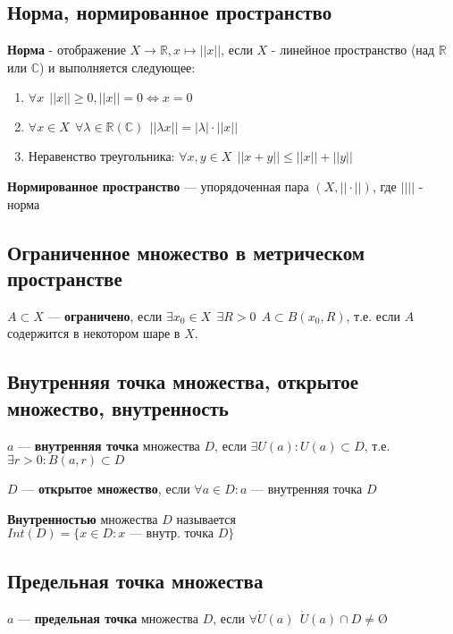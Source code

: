 \subsection{Норма, нормированное пространство}

\textbf{Норма} - отображение $X\to\mathbb{R}, x\mapsto ||x||$, если $X$ - линейное пространство (над $\mathbb{R}$ или $\mathbb{C}$) и выполняется следующее:
\begin{enumerate}
\item $\forall x \ \ ||x||\geq 0, ||x||=0\Leftrightarrow x=0$
\item $\forall x\in X \ \ \forall \lambda\in\mathbb R(\mathbb{C}) \ \ ||\lambda x||=|\lambda|\cdot||x||$
\item Неравенство треугольника: $\forall x,y\in X \ \ ||x+y||\leq||x||+||y||$
\end{enumerate}

\textbf{Нормированное пространство} --- упорядоченная пара $(X, ||\cdot||)$, где $|| ||$ - норма

\subsection{Ограниченное множество в метрическом пространстве}

$A\subset X$ --- {\bf ограничено}, если $\exists x_0\in X \ \ \exists R>0 \ \ A\subset B(x_0, R)$, т.е. если $A$ содержится в некотором шаре в $X$.

\subsection{Внутренняя точка множества, открытое множество, внутренность}

$a$ --- {\bf внутренняя точка} множества $D$, если $\exists U(a) : U(a)\subset D$, т.е. $\exists r>0 : B(a,r)\subset D$

$D$ --- {\bf открытое множество}, если $\forall a\in D : a$ --- внутренняя точка $D$

{\bf Внутренностью} множества $D$ называется $Int(D)=\{x\in D : x \text{ --- внутр. точка }D\}$

\subsection{Предельная точка множества}

$a$ --- {\bf предельная точка} множества $D$, если $\forall \dot U(a) \ \ \dot U(a)\cap D\not = \text{\O}$

